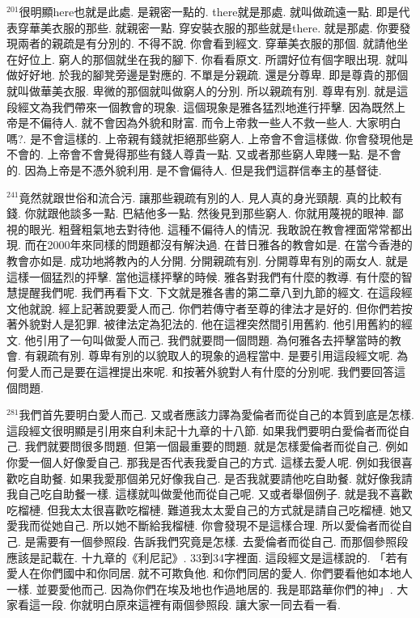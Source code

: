 \documentclass{book}
\begin{document}
$^{201}$很明顯here也就是此處.
是親密一點的.
there就是那處.
就叫做疏遠一點.
即是代表穿華美衣服的那些.
就親密一點.
穿安裝衣服的那些就是there.
就是那處.
你要發現兩者的親疏是有分別的.
不得不說.
你會看到經文.
穿華美衣服的那個.
就請他坐在好位上.
窮人的那個就坐在我的腳下.
你看看原文.
所謂好位有個字眼出現.
就叫做好好地.
於我的腳凳旁邊是對應的.
不單是分親疏.
還是分尊卑.
即是尊貴的那個就叫做華美衣服.
卑微的那個就叫做窮人的分別.
所以親疏有別.
尊卑有別.
就是這段經文為我們帶來一個教會的現象.
這個現象是雅各猛烈地進行抨擊.
因為既然上帝是不偏待人.
就不會因為外貌和財富.
而令上帝救一些人不救一些人.
大家明白嗎?.
是不會這樣的.
上帝親有錢就拒絕那些窮人.
上帝會不會這樣做.
你會發現他是不會的.
上帝會不會覺得那些有錢人尊貴一點.
又或者那些窮人卑賤一點.
是不會的.
因為上帝是不憑外貌利用.
是不會偏待人.
但是我們這群信奉主的基督徒.

$^{241}$竟然就跟世俗和流合污.
讓那些親疏有別的人.
見人真的身光頸靚.
真的比較有錢.
你就跟他談多一點.
巴結他多一點.
然後見到那些窮人.
你就用蔑視的眼神.
鄙視的眼光.
粗聲粗氣地去對待他.
這種不偏待人的情況.
我敢說在教會裡面常常都出現.
而在2000年來同樣的問題都沒有解決過.
在昔日雅各的教會如是.
在當今香港的教會亦如是.
成功地將教內的人分開.
分開親疏有別.
分開尊卑有別的兩女人.
就是這樣一個猛烈的抨擊.
當他這樣抨擊的時候.
雅各對我們有什麼的教導.
有什麼的智慧提醒我們呢.
我們再看下文.
下文就是雅各書的第二章八到九節的經文.
在這段經文他就說.
經上記著說要愛人而己.
你們若傳守者至尊的律法才是好的.
但你們若按著外貌對人是犯罪.
被律法定為犯法的.
他在這裡突然間引用舊約.
他引用舊約的經文.
他引用了一句叫做愛人而己.
我們就要問一個問題.
為何雅各去抨擊當時的教會.
有親疏有別.
尊卑有別的以貌取人的現象的過程當中.
是要引用這段經文呢.
為何愛人而己是要在這裡提出來呢.
和按著外貌對人有什麼的分別呢.
我們要回答這個問題.

$^{281}$我們首先要明白愛人而己.
又或者應該力譯為愛倫者而從自己的本質到底是怎樣.
這段經文很明顯是引用來自利未記十九章的十八節.
如果我們要明白愛倫者而從自己.
我們就要問很多問題.
但第一個最重要的問題.
就是怎樣愛倫者而從自己.
例如你愛一個人好像愛自己.
那我是否代表我愛自己的方式.
這樣去愛人呢.
例如我很喜歡吃自助餐.
如果我愛那個弟兄好像我自己.
是否我就要請他吃自助餐.
就好像我請我自己吃自助餐一樣.
這樣就叫做愛他而從自己呢.
又或者舉個例子.
就是我不喜歡吃榴槤.
但我太太很喜歡吃榴槤.
難道我太太愛自己的方式就是請自己吃榴槤.
她又愛我而從她自己.
所以她不斷給我榴槤.
你會發現不是這樣合理.
所以愛倫者而從自己.
是需要有一個參照段.
告訴我們究竟是怎樣.
去愛倫者而從自己.
而那個參照段應該是記載在.
十九章的《利尼記》.
33到34字裡面.
這段經文是這樣說的.
「若有愛人在你們國中和你同居.
就不可欺負他.
和你們同居的愛人.
你們要看他如本地人一樣.
並要愛他而己.
因為你們在埃及地也作過地居的.
我是耶路華你們的神」.
大家看這一段.
你就明白原來這裡有兩個參照段.
讓大家一同去看一看.
\end{document}
